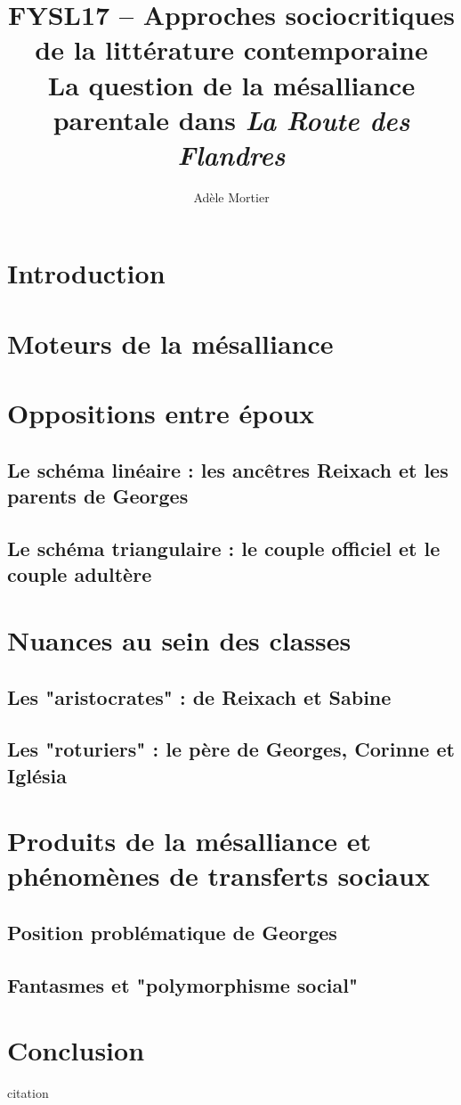 \documentclass[a4paper,10pt]{article}
\title{ FYSL17 -- Approches sociocritiques de la littérature contemporaine\\ \vspace{0.3cm}
	 \small La question de la mésalliance parentale dans \textit{La Route des Flandres}}
\author{Adèle Mortier}
\begin{document}
\maketitle
\nocite{*}
\section*{Introduction}
\section{Moteurs de la mésalliance}
\section{Oppositions entre époux}
	\subsection{Le schéma linéaire : les ancêtres Reixach et les parents de Georges}
	\subsection{Le schéma triangulaire : le couple officiel et le couple adultère}
\section{Nuances au sein des classes}
	\subsection{Les "aristocrates" : de Reixach et Sabine}
	\subsection{Les "roturiers" : le père de Georges, Corinne et Iglésia}
\section{Produits de la mésalliance et phénomènes de transferts sociaux}
	\subsection{Position problématique de Georges}
	\subsection{Fantasmes et "polymorphisme social"}

\section*{Conclusion}

\begin{center}
	\footnotesize
	\begin{minipage}{0.7\textwidth}
		citation
	\end{minipage}
\end{center}
\medskip



\end{document}
